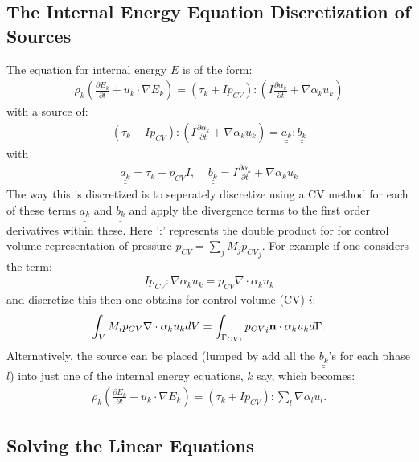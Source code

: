 \subsection{The Internal Energy Equation Discretization of Sources} 
\label{thermal-sources}
The equation for internal energy $E$ is of the form: 
\begin{eqnarray}
\rho_k (\frac{\partial E_k}{\partial t} + u_k\cdot\nabla E_k )
= (\tau_k + I p_{CV}):  (I\frac{\partial\alpha_k}{\partial t}+ \nabla \alpha_k u_k )
\end{eqnarray}
with a source of:
\begin{eqnarray}
(\tau_k + Ip_{CV}) :  (I\frac{\partial\alpha_k}{\partial t}+ \nabla \alpha_k u_k )= \underline{\underline {a_k}} :  \underline{\underline {b_k}}
\end{eqnarray}
with
\begin{eqnarray}
\underline{\underline {a_k}}=\tau_k + p_{CV} I,  \;\;\;\;
\underline{\underline {b_k}}=I\frac{\partial\alpha_k}{\partial t}+ \nabla \alpha_k u_k 
\end{eqnarray}
The way this is discretized is to seperately discretize using a CV method 
for each of these terms $\underline{\underline {a_k}}$ and $\underline{\underline {b_k}}$ and apply the divergence terms to the first order 
derivatives within these. Here ':' represents the double product for for control volume 
representation of pressure $p_{CV} = \sum_j M_j {p_{CV}}_j$.  
For example if one considers the term:
\begin{eqnarray}
Ip_{CV} :  \nabla \alpha_k u_k = p_{CV} \nabla \cdot \alpha_k u_k 
\end{eqnarray}
and discretize this then one obtains for control volume (CV) $i$:
\begin{eqnarray}
 \int_V M_i p_{CV}\nabla \cdot \alpha_k u_k dV = \int_{\Gamma_{CVi}} {p_{CV}}_i {\bf n}\cdot \alpha_k u_k d\Gamma. 
\end{eqnarray}
Alternatively, the source can be placed (lumped by add all the $\underline{\underline {b_k}}$'s for each phase $l$) into just one of the internal energy equations, $k$ say, which becomes:
\begin{eqnarray}
\rho_k (\frac{\partial E_k}{\partial t} + u_k\cdot\nabla E_k )
= (\tau_k + I p_{CV}):  \sum_l \nabla \alpha_l u_l . 
\end{eqnarray}



\subsection{Solving the Linear Equations}

